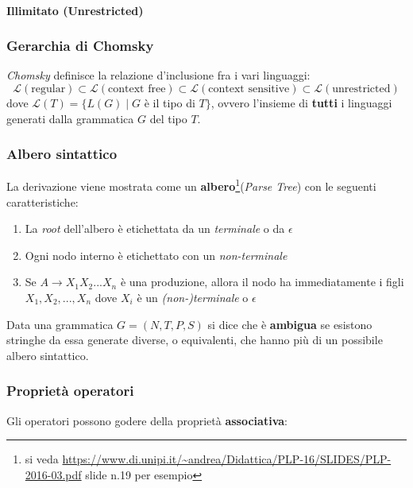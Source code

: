 \paragraph{Illimitato (\textbf{Unrestricted})}

\subsubsection{Gerarchia di Chomsky}
\label{sec:gerarchia_chomsky}
\textit{Chomsky} definisce la relazione d'inclusione fra i vari linguaggi:
$$\mathcal{L}(\text{regular}) \subset
\mathcal{L}(\text{context free}) \subset
\mathcal{L}(\text{context sensitive}) \subset
\mathcal{L}(\text{unrestricted})$$
dove $\mathcal{L}(T) = \{L(G) \mid G$ è il tipo di $T\}$, ovvero l'insieme di
\textbf{tutti} i linguaggi generati dalla grammatica $G$ del tipo $T$.

\subsubsection{Albero sintattico}
\label{sec:albero_sintattico}
La derivazione viene mostrata come un \textbf{albero}\footnote{si veda
\url{https://www.di.unipi.it/~andrea/Didattica/PLP-16/SLIDES/PLP-2016-03.pdf}
slide n.19 per esempio}(\textit{Parse Tree}) con le seguenti caratteristiche:
\begin{enumerate}
\item La \textit{root} dell'albero è etichettata da un \textit{terminale} o
da $\epsilon$
\item Ogni nodo interno è etichettato con un \textit{non-terminale}
\item Se $A \to X_1 X_2 ... X_n$ è una produzione, allora il nodo ha
immediatamente i figli $X_1, X_2, ..., X_n$ dove $X_i$ è un
\textit{(non-)terminale} o $\epsilon$
\end{enumerate}

\begin{definition}[Ambiguity]
Data una grammatica $G=(N,T,P,S)$ si dice che è \textbf{ambigua} se esistono
stringhe da essa generate diverse, o equivalenti, che hanno più di un possibile
albero sintattico.
\end{definition}

\subsubsection{Proprietà operatori}
\label{sec:proprieta_operatori}
Gli operatori possono godere della proprietà \textbf{associativa}:

